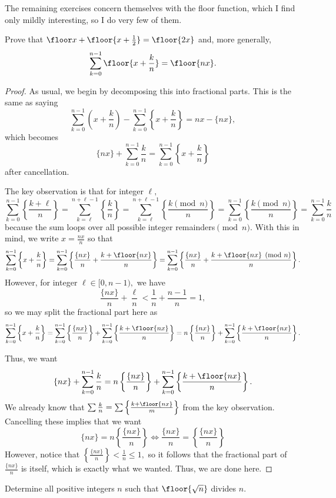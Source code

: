 The remaining exercises concern themselves with the floor function, which I find only mildly interesting, so I do very few of them.

\begin{exercise}[17]
Prove that $\floor x+\floor{x+\textstyle\frac12}=\floor{2x}$ and, more generally,
\[\sum_{k=0}^{n-1}\floor{x+\frac kn}=\floor{nx}.\]
\end{exercise}

\begin{proof}
As usual, we begin by decomposing this into fractional parts. This is the same as saying
\[\sum_{k=0}^{n-1}\left(x+\frac kn\right)-\sum_{k=0}^{n-1}\left\{x+\frac kn\right\}=nx-\{nx\},\]
which becomes
\[\{nx\}+\sum_{k=0}^{n-1}\frac kn=\sum_{k=0}^{n-1}\left\{x+\frac kn\right\}\]
after cancellation.

The key observation is that for integer $\ell,$
\[\sum_{k=0}^{n-1}\left\{\frac{k+\ell}n\right\}=\sum_{k=\ell}^{n+\ell-1}\left\{\frac kn\right\}=\sum_{k=\ell}^{n+\ell-1}\left\{\frac{k\pmod n}n\right\}=\sum_{k=0}^{n-1}\left\{\frac{k\pmod n}n\right\}=\sum_{k=0}^{n-1}\frac kn\]
because the sum loops over all possible integer remainders$\pmod n.$ With this in mind, we write $x=\frac{nx}n$ so that
\[\sum_{k=0}^{n-1}\left\{x+\frac kn\right\}=\sum_{k=0}^{n-1}\left\{\frac{\{nx\}}n+\frac{k+\floor{nx}}n\right\}=\sum_{k=0}^{n-1}\left\{\frac{\{nx\}}n+\frac{k+\floor{nx}\pmod n}n\right\}.\]
However, for integer $\ell\in[0,n-1),$ we have
\[\frac{\{nx\}}n+\frac\ell n<\frac1n+\frac{n-1}n=1,\]
so we may split the fractional part here as
\[\sum_{k=0}^{n-1}\left\{x+\frac kn\right\}=\sum_{k=0}^{n-1}\left\{\frac{\{nx\}}n\right\}+\sum_{k=0}^{n-1}\left\{\frac{k+\floor{nx}}n\right\}=n\left\{\frac{\{nx\}}n\right\}+\sum_{k=0}^{n-1}\left\{\frac{k+\floor{nx}}n\right\}.\]

Thus, we want
\[\{nx\}+\sum_{k=0}^{n-1}\frac kn=n\left\{\frac{\{nx\}}n\right\}+\sum_{k=0}^{n-1}\left\{\frac{k+\floor{nx}}n\right\}.\]
We already know that $\sum\frac kn=\sum\left\{\frac{k+\floor{nx}}m\right\}$ from the key observation. Cancelling these implies that we want
\[\{nx\}=n\left\{\frac{\{nx\}}n\right\}\iff\frac{\{nx\}}n=\left\{\frac{\{nx\}}n\right\}\]
However, notice that $\left\{\frac{\{nx\}}n\right\}<\frac 1n\le1,$ so it follows that the fractional part of $\frac{\{nx\}}n$ is itself, which is exactly what we wanted. Thus, we are done here.
\end{proof}

\begin{exercise}[21]
Determine all positive integers $n$ such that $\floor{\sqrt n}$ divides $n.$
\end{exercise}

